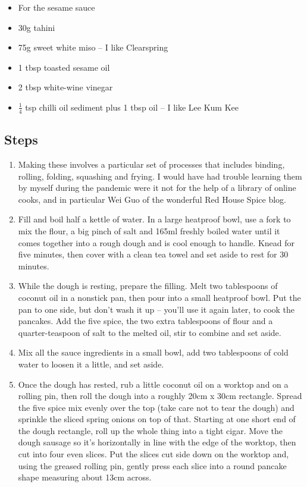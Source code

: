 \documentclass{book}
\begin{document}
\begin{itemize}
\item For the sesame sauce
\item 30g tahini
\item 75g sweet white miso – I like Clearspring
\item 1 tbsp toasted sesame oil
\item 2 tbsp white-wine vinegar
\item $\frac{1}{4}$ tsp chilli oil sediment plus 1 tbsp oil – I like Lee Kum Kee
\end{itemize}

\subsection*{Steps}
\begin{enumerate}
\item Making these involves a particular set of processes that includes binding, rolling, folding, squashing and frying. I would have had trouble learning them by myself during the pandemic were it not for the help of a library of online cooks, and in particular Wei Guo of the wonderful Red House Spice blog.
\item Fill and boil half a kettle of water. In a large heatproof bowl, use a fork to mix the flour, a big pinch of salt and 165ml freshly boiled water until it comes together into a rough dough and is cool enough to handle. Knead for five minutes, then cover with a clean tea towel and set aside to rest for 30 minutes.
\item While the dough is resting, prepare the filling. Melt two tablespoons of coconut oil in a nonstick pan, then pour into a small heatproof bowl. Put the pan to one side, but don’t wash it up – you’ll use it again later, to cook the pancakes. Add the five spice, the two extra tablespoons of flour and a quarter-teaspoon of salt to the melted oil, stir to combine and set aside.
\item Mix all the sauce ingredients in a small bowl, add two tablespoons of cold water to loosen it a little, and set aside.
\item Once the dough has rested, rub a little coconut oil on a worktop and on a rolling pin, then roll the dough into a roughly 20cm x 30cm rectangle. Spread the five spice mix evenly over the top (take care not to tear the dough) and sprinkle the sliced spring onions on top of that. Starting at one short end of the dough rectangle, roll up the whole thing into a tight cigar. Move the dough sausage so it’s horizontally in line with the edge of the worktop, then cut into four even slices. Put the slices cut side down on the worktop and, using the greased rolling pin, gently press each slice into a round pancake shape measuring about 13cm across.

\end{enumerate}
\end{document}
